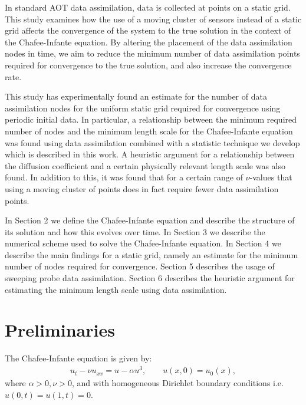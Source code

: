 \documentclass[12pt]{amsart}
\theoremstyle{plain}
\theoremstyle{definition}
\theoremstyle{remark}
\numberwithin{equation}{section} %
\numberwithin{figure}{section}   %
\begin{document}
In standard AOT data assimilation, data is collected at points on a static grid. This study examines how the use of a moving cluster of sensors instead of a static grid affects the convergence of the system to the true solution in the context of the Chafee-Infante equation. By altering the placement of the data assimilation nodes in time, we aim to reduce the minimum number of data assimilation points required for convergence to the true solution, and also increase the convergence rate.

This study has experimentally found an estimate for the number of data assimilation nodes for the uniform static grid required for convergence using periodic initial data. In particular, a relationship between the minimum required number of nodes and the minimum length scale for the Chafee-Infante equation was found using data assimilation combined with a statistic technique we develop which is described in this work. A heuristic argument for a relationship between the diffusion coefficient and a certain physically relevant length scale was also found. In addition to this, it was found that for a certain range of $\nu$-values that using a moving cluster of points does in fact require fewer data assimilation points.

In Section 2 we define the Chafee-Infante equation and describe the structure of its solution and how this evolves over time. In Section 3 we describe the numerical scheme used to solve the Chafee-Infante equation. In Section 4 we describe the main findings for a static grid, namely an estimate for the minimum number of nodes required for convergence. Section 5 describes the usage of sweeping probe data assimilation. Section 6 describes the heuristic argument for estimating the minimum length scale using data assimilation. 

\section{Preliminaries}\label{secPre}
\noindent
The Chafee-Infante equation is given by: 
\begin{align*}
u_t - \nu u_{xx} = u - \alpha u^3, \qquad
u(x,0) = u_0(x),
\end{align*}
where $\alpha>0, \nu>0$, and with homogeneous Dirichlet boundary conditions i.e. $u(0,t) = u(1,t) = 0$. 
\end{document}
